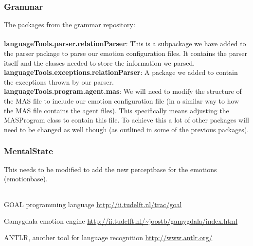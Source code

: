 \documentclass[]{article}
\begin{document}
\subsubsection{Grammar}
The packages from the grammar repository: \\ \\
\textbf{languageTools.parser.relationParser}: This is a subpackage we have added to the parser package to parse our emotion configuration files. It contains the parser itself and the classes needed to store the information we parsed.\\
\textbf{languageTools.exceptions.relationParser}: A package we added to contain the exceptions thrown by our parser. \\
\textbf{languageTools.program.agent.mas}: We will need to modify the structure of the MAS file to include our emotion configuration file (in a similar way to how the MAS file contains the agent files). This specifically means adjusting the MASProgram class to contain this file. To achieve this a lot of other packages will need to be changed as well though (as outlined in some of the previous packages).\\

\subsubsection{MentalState}
This needs to be modified to add the new perceptbase for the emotions (emotionbase). \\ \\

\clearpage
\printglossaries
\begin{thebibliography}{9}
	
	GOAL programming language
	\url{http://ii.tudelft.nl/trac/goal}
	
	Gamygdala emotion engine
	\url{http://ii.tudelft.nl/~joostb/gamygdala/index.html}
	
	ANTLR, another tool for language recognition
	\url{http://www.antlr.org/}
	
	
\end{thebibliography}
\end{document}

